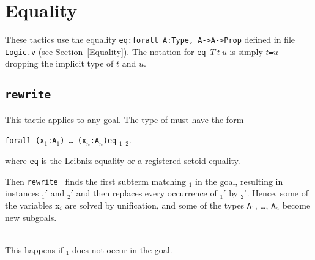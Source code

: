 \section{Equality}

These tactics use the equality {\tt eq:forall A:Type, A->A->Prop}
defined in file {\tt Logic.v} (see Section~\ref{Equality}). The
notation for {\tt eq}~$T~t~u$ is simply {\tt $t$=$u$} dropping the
implicit type of $t$ and $u$.

\subsection{\tt rewrite \term
\label{rewrite}
}

This tactic applies to any goal. The type of {\term}
must have the form

\texttt{forall (x$_1$:A$_1$) \dots\ (x$_n$:A$_n$)}\texttt{eq} \term$_1$ \term$_2$. 

\noindent where \texttt{eq} is the Leibniz equality or a registered
setoid equality.

\noindent Then {\tt rewrite \term} finds the first subterm matching
\term$_1$ in the goal, resulting in instances \term$_1'$ and \term$_2'$
and then replaces every occurrence of \term$_1'$ by \term$_2'$.
Hence, some of the variables x$_i$ are
solved by unification, and some of the types \texttt{A}$_1$, \dots,
\texttt{A}$_n$ become new subgoals.


\begin{ErrMsgs}
\item {}

\item {}\\
This happens if \term$_1$ does not occur in the goal.
\end{ErrMsgs}

